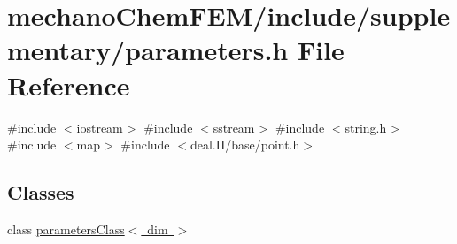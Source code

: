 \section{mechano\+Chem\+F\+E\+M/include/supplementary/parameters.h File Reference}
\label{parameters_8h}
{\ttfamily \#include $<$iostream$>$}\newline
{\ttfamily \#include $<$sstream$>$}\newline
{\ttfamily \#include $<$string.\+h$>$}\newline
{\ttfamily \#include $<$map$>$}\newline
{\ttfamily \#include $<$deal.\+I\+I/base/point.\+h$>$}\newline
\subsection*{Classes}
\begin{DoxyCompactItemize}
\item 
class \mbox{\hyperlink{classparameters_class}{parameters\+Class$<$ dim $>$}}
\end{DoxyCompactItemize}
